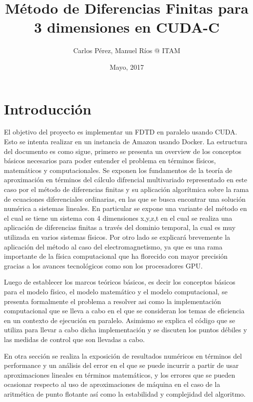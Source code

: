 \documentclass[]{article}
\title{Método de Diferencias Finitas para 3 dimensiones en CUDA-C}
\author{Carlos Pérez, Manuel Ríos @ ITAM}
\date{Mayo, 2017}
\begin{document}
\maketitle

\newpage 

\section{Introducción}\label{introduccion}

El objetivo del proyecto es implementar un FDTD en paralelo usando CUDA.
Esto se intenta realizar en un instancia de Amazon usando Docker. La
estructura del documento es como sigue, primero se presenta un overview
de los conceptos básicos necesarios para poder entender el problema en
términos físicos, matemáticos y computacionales. Se exponen los
fundamentos de la teoría de aproximación en términos del cálculo
difrencial multivariado representado en este caso por el método de
diferencias finitas y su aplicación algorítmica sobre la rama de
ecuaciones diferenciales ordinarias, en las que se busca encontrar una
solución numérica a sistemas lineales. En particular se expone una
variante del método en el cual se tiene un sistema con 4 dimensiones
x,y,z,t en el cual se realiza una aplicación de diferencias finitas a
través del dominio temporal, la cual es muy utilizada en varios sistemas
físicos. Por otro lado se explicará brevemente la aplicación del método
al caso del electromagnetismo, ya que es una rama importante de la
física computacional que ha florecido con mayor precisión gracias a los
avances tecnológicos como son los procesadores GPU.

Luego de establecer los marcos teóricos básicos, es decir los conceptos
básicos para el modelo físico, el modelo matemático y el modelo
computacional, se presenta formalmente el problema a resolver asi como
la implementación computacional que se lleva a cabo en el que se
consideran los temas de eficiencia en un contexto de ejecución en
paralelo. Asimismo se explica el código que se utiliza para llevar a
cabo dicha implementación y se discuten los puntos débiles y las medidas
de control que son llevadas a cabo.

En otra sección se realiza la exposición de resultados numéricos en
términos del performance y un análisis del error en el que se puede
incurrir a partir de usar aproximaciones lineales en términos
matemáticos, y los errores que se pueden ocasionar respecto al uso de
aproximaciones de máquina en el caso de la aritmética de punto flotante
así como la estabilidad y complejidad del algoritmo.
\end{document}
